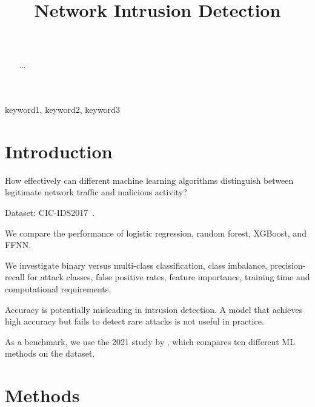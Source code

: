 \documentclass[a4paper]{IEEEtran}
\begin{document}
\title{Network Intrusion Detection}

\author{
    \\
}

\maketitle

\begin{abstract}
...
\end{abstract}

\begin{IEEEkeywords}
keyword1, keyword2, keyword3
\end{IEEEkeywords}

\section{Introduction}

How effectively can different machine learning algorithms distinguish between
legitimate network traffic and malicious activity?

Dataset: CIC-IDS2017~\cite{sharafaldin_2018}.

We compare the performance of logistic regression, random forest, XGBoost, and FFNN.

We investigate binary versus multi-class classification, class imbalance, precision-recall
for attack classes, false positive rates, feature importance, training time and computational
requirements.

Accuracy is potentially misleading in intrusion detection. A model that achieves
high accuracy but fails to detect rare attacks is not useful in practice.

As a benchmark, we use the 2021 study by \textcite{maseer_2021}, which compares ten different ML methods on the dataset.

\section{Methods}

\printbibliography

\appendix
\end{document}
